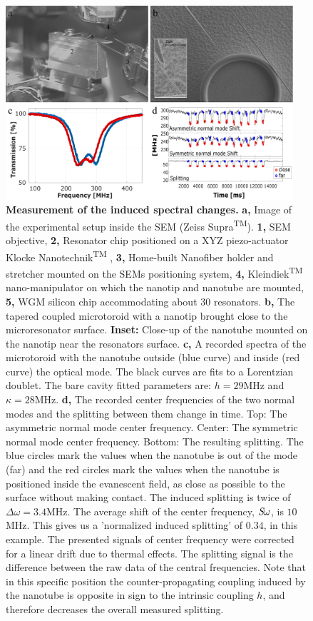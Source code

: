 \documentclass[journal=jacsat,manuscript=article]{achemso}
\begin{document}
\begin{figure}[H]
\centering
          \includegraphics[width=0.95\textwidth]{Images/figure_3_v4.png}
    \caption{\textbf{Measurement of the induced spectral changes.} \textbf{a,} Image of the experimental setup inside the SEM (Zeiss Supra\textsuperscript{TM}). \textbf{1,} SEM objective, \textbf{2,} Resonator chip positioned on a XYZ piezo-actuator Klocke Nanotechnik\textsuperscript{TM} , \textbf{3,} Home-built Nanofiber holder and stretcher mounted on the SEMs positioning system, \textbf{4,} Kleindiek\textsuperscript{TM} nano-manipulator on which the nanotip and nanotube are mounted, \textbf{5,} WGM silicon chip accommodating about 30 resonators. \textbf{b,} The tapered coupled microtoroid with a nanotip brought close to the microresonator surface. \textbf{Inset:} Close-up of the nanotube mounted on the nanotip near the resonators surface. \textbf{c,} A recorded spectra of the microtoroid with the nanotube outside (blue curve) and inside (red curve) the optical mode. The black curves are fits to a Lorentzian doublet. The bare cavity fitted parameters are: $h=29$MHz and $\kappa=28$MHz. \textbf{d,} The recorded center frequencies of the two normal modes and the splitting between them change in time. Top: The asymmetric normal mode center frequency. Center: The symmetric normal mode center frequency. Bottom: The resulting splitting. The blue circles mark the values when the nanotube is out of the mode (far) and the red circles mark the values when the nanotube is positioned inside the evanescent field, as close as possible to the surface without making contact. The induced splitting is twice of $\Delta \omega = 3.4$MHz. The average shift of the center frequency, $\textit S \omega$, is $10$MHz. This gives us a 'normalized induced splitting' of $0.34$, in this example. The presented signals of center frequency were corrected for a linear drift due to thermal effects. The splitting signal is the difference between the raw data of the central frequencies. Note that in this specific position the counter-propagating coupling induced by the nanotube is opposite in sign to the intrinsic coupling $h$, and therefore decreases the overall measured splitting.
		\label{fig:experiment}}
\end{figure}
\end{document}
